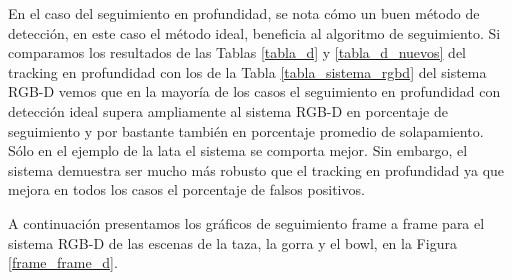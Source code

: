 En el caso del seguimiento en profundidad, se nota cómo un buen método de detección, en este caso el método ideal, beneficia al algoritmo de seguimiento. Si comparamos los resultados de las Tablas \ref{tabla_d} y \ref{tabla_d_nuevos} del tracking en profundidad con los de la Tabla \ref{tabla_sistema_rgbd} del sistema RGB-D vemos que en la mayoría de los casos el seguimiento en profundidad con detección ideal supera ampliamente al sistema RGB-D en porcentaje de seguimiento y por bastante también en porcentaje promedio de solapamiento. Sólo en el ejemplo de la lata el sistema se comporta mejor. Sin embargo, el sistema demuestra ser mucho más robusto que el tracking en profundidad ya que mejora en todos los casos el porcentaje de falsos positivos.

A continuación presentamos los gráficos de seguimiento frame a frame para el sistema RGB-D de las escenas de la taza, la gorra y el bowl, en la Figura \ref{frame_frame_d}.

